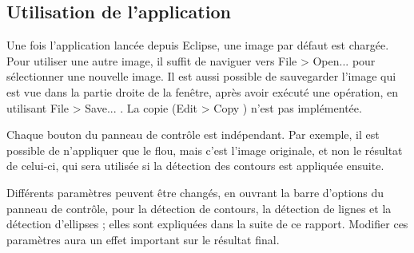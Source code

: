 \documentclass[a4paper, 11pt]{article}
\begin{document}
\begin{multicols}{2}

\section{Utilisation de l'application}
\par
Une fois l'application lancée depuis Eclipse, une image par défaut est chargée. Pour utiliser une autre image, il suffit de naviguer vers \og File > Open... \fg{} pour sélectionner une nouvelle image. Il est aussi possible de sauvegarder l'image qui est vue dans la partie droite de la fenêtre, après avoir exécuté une opération, en utilisant \og File > Save... \fg{}. La copie (\og Edit > Copy \fg{}) n'est pas implémentée.
\par
Chaque bouton du panneau de contrôle est indépendant. Par exemple, il est possible de n'appliquer que le flou, mais c'est l'image originale, et non le résultat de celui-ci, qui sera utilisée si la détection des contours est appliquée ensuite.
\par
Différents paramètres peuvent être changés, en ouvrant la barre d'options du panneau de contrôle, pour la détection de contours, la détection de lignes et la détection d'ellipses ; elles sont expliquées dans la suite de ce rapport. Modifier ces paramètres aura un effet important sur le résultat final.


\end{multicols}
\end{document}
